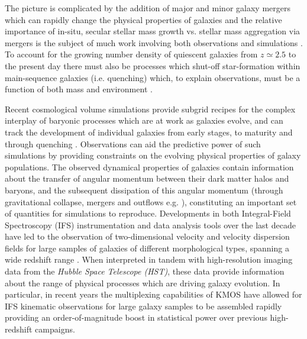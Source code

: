 \documentclass[fleqn,usenatbib]{mnras}
\begin{document}
The picture is complicated by the addition of major and minor galaxy mergers which can rapidly change the physical properties of galaxies \citep[e.g.][]{Toomre1977,Lotz2008,Conselice2011,Conselice2014} and the relative importance of in-situ, secular stellar mass growth vs. stellar mass aggregation via mergers is the subject of much work involving both observations and simulations \citep[e.g.][]{Robaina2009,Kaviraj2012,Stott2013,Lofthouse2017,Qu2017}. 
To account for the growing number density of quiescent galaxies from $z\simeq2.5$ to the present day \citep[e.g.][]{Bell2004,Faber2007,Brown2007,Ilbert2010,Brammer2011,Muzzin2013,Buitrago2013} there must also be processes which shut-off star-formation within main-sequence galaxies (i.e. quenching) which, to explain observations, must be a function of both mass and environment \citep{Peng2010,Darvish2016}.

Recent cosmological volume simulations provide subgrid recipes for the complex interplay of baryonic processes which are at work as galaxies evolve, and can track the development of individual galaxies from early stages, to maturity and through quenching \citep{Dubois2014,Vogelsberger2014b,Schaye2015}.
Observations can aid the predictive power of such simulations by providing constraints on the evolving physical properties of galaxy populations.
The observed dynamical properties of galaxies contain information about the transfer of angular momentum between their dark matter halos and baryons, and the subsequent dissipation of this angular momentum (through gravitational collapse, mergers and outflows e.g. \citealt{Fall1983,Romanowsky2012,Fall2013}), constituting an important set of quantities for simulations to reproduce.
Developments in both Integral-Field Spectroscopy (IFS) instrumentation and data analysis tools over the last decade have led to the observation of two-dimensional velocity and velocity dispersion fields for large samples of galaxies of different morphological types, spanning a wide redshift range \citep[e.g.][]{Sarzi2005,Flores2006,Epinat2008,ForsterSchreiber2009,Cappellari2011,Gnerucci2011,Epinat2012,Croom2012,Swinbank2012,Swinbank2012a,Bundy2015,Wisnioski2015,Stott2016,Harrison2017,Swinbank2017}.
When interpreted in tandem with high-resolution imaging data from the {\it Hubble Space Telescope (HST)}, these data provide information about the range of physical processes which are driving galaxy evolution.
In particular, in recent years the multiplexing capabilities of KMOS \citep{Sharples2013} have allowed for IFS kinematic observations for large galaxy samples to be assembled rapidly \citep{Sobral2013,Wisnioski2015,Stott2016,Mason2017,Harrison2017} providing an order-of-magnitude boost in statistical power over previous high-redshift campaigns.    
\end{document}
